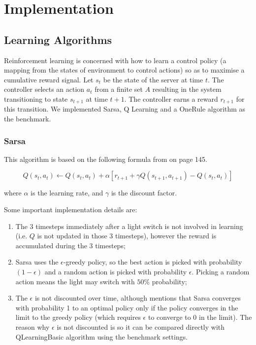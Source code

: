 \section{Implementation}

\subsection{Learning Algorithms}

Reinforcement learning is concerned with how to learn a control policy (a mapping from the states of environment to control actions) so as to maximise a cumulative reward signal. Let $s_t$ be the state of the server at time $t$. The controller selects an action $a_t$ from a finite set $A$ resulting in the system transitioning to state $s_{t+1}$ at time $t+1$. The controller earns a reward $r_{t+1}$ for this transition. We implemented Sarsa, Q Learning and a OneRule algorithm as the benchmark.

\subsubsection{Sarsa}

This algorithm is based on the following formula from \cite{Sutton_1998} on page 145.

\begin{equation}
Q(s_{t},a_{t})\leftarrow Q(s_{t},a_{t}) + \alpha [ r_{t+1}+\gamma Q(s_{t+1},a_{t+1}) - Q(s_{t},a_{t}) ]
\end{equation}

where $\alpha $ is the learning rate, and $\gamma $ is the discount factor.

Some important implementation details are:

\begin{enumerate}
\item The 3 timesteps immediately
after a light switch is not involved in learning (i.e. $Q$ is not
updated in those 3 timesteps), however the reward is accumulated
during the 3 timesteps;

\item Sarsa uses the $\epsilon $-greedy policy, so
the best action is picked with probability $(1-\epsilon )$ and a
random action is picked with probability $\epsilon $. Picking
a random action means the light may switch with $50\%$ probability;

\item The $\epsilon $ is not discounted over time, although \cite{Sutton_1998}
mentions that Sarsa converges with probability 1 to an optimal policy
only if the policy converges in the limit to the greedy policy (which
requires $\epsilon $ to converge to 0 in the limit). The reason why
$\epsilon $ is not discounted is so it can be compared directly with
QLearningBasic algorithm using the benchmark settings.

\end{enumerate}

